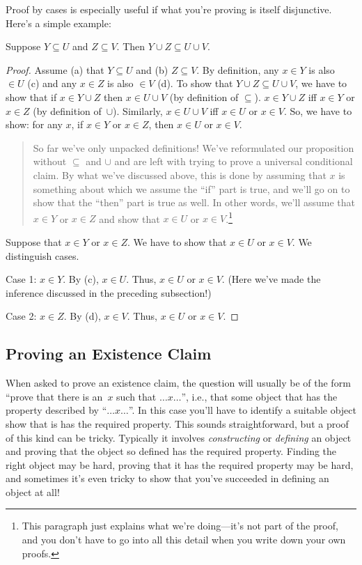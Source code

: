 \documentclass[../../../include/open-logic-section]{subfiles}
\begin{document}
Proof by cases is especially useful if what you're proving is itself
disjunctive. Here's a simple example:

\begin{prop}
Suppose $Y \subseteq U$ and $Z \subseteq V$. Then $Y \cup Z \subseteq
U \cup V$.
\end{prop}

\begin{proof}
  Assume (a) that $Y \subseteq U$ and (b) $Z \subseteq V$. By
  definition, any $x \in Y$ is also $\in U$ (c) and any $x \in Z$ is
  also $\in V$ (d).  To show that $Y \cup Z \subseteq U \cup V$, we
  have to show that if $x \in Y \cup Z$ then $x \in U \cup V$ (by
  definition of $\subseteq$). $x \in Y \cup Z$ iff $x \in Y$ or $x \in
  Z$ (by definition of~$\cup$). Similarly, $x \in U \cup V$ iff $x \in
  U$ or $x \in V$. So, we have to show: for any $x$, if $x \in Y$ or
  $x \in Z$, then $x \in U$ or $x \in V$.

  \begin{quote}
  So far we've only unpacked definitions!{} We've reformulated our
  proposition without $\subseteq$ and $\cup$ and are left with trying
  to prove a universal conditional claim. By what we've discussed
  above, this is done by assuming that $x$ is something about which we
  assume the ``if'' part is true, and we'll go on to show that the
  ``then'' part is true as well. In other words, we'll assume that $x
  \in Y$ or $x \in Z$ and show that $x \in U$ or $x \in
  V$.\footnote{This paragraph just explains what we're doing---it's
    not part of the proof, and you don't have to go into all this
    detail when you write down your own proofs.}
  \end{quote}

  Suppose that $x \in Y$ or $x \in Z$. We have to show that $x \in U$
  or $x \in V$. We distinguish cases.

  Case 1: $x \in Y$. By (c), $x \in U$. Thus, $x \in U$ or $x \in
  V$. (Here we've made the inference discussed in the preceding
  subsection!)
      
  Case 2: $x \in Z$. By (d), $x \in V$. Thus, $x \in U$ or $x \in V$.
 \end{proof}


\subsection{Proving an Existence Claim}

When asked to prove an existence claim, the question will usually be
of the form ``prove that there is an~$x$ such that $\dots x \dots$'',
i.e., that some object that has the property described by ``$\dots x
\dots$''. In this case you'll have to identify a suitable object show
that is has the required property.  This sounds straightforward, but a
proof of this kind can be tricky. Typically it involves
\emph{constructing} or \emph{defining} an object and proving that the
object so defined has the required property. Finding the right object
may be hard, proving that it has the required property may be hard,
and sometimes it's even tricky to show that you've succeeded in
defining an object at all!{}
\end{document}

